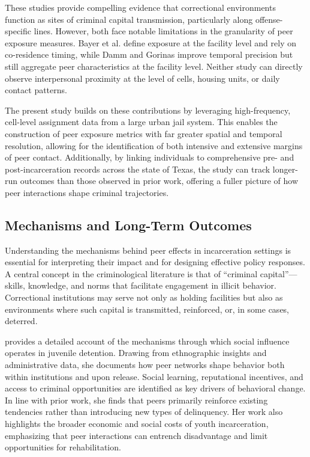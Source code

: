 \documentclass[12pt, a4paper]{article}
\begin{document}
These studies provide compelling evidence that correctional environments function as sites of criminal capital transmission, particularly along offense-specific lines. However, both face notable limitations in the granularity of peer exposure measures. Bayer et al. define exposure at the facility level and rely on co-residence timing, while Damm and Gorinas improve temporal precision but still aggregate peer characteristics at the facility level. Neither study can directly observe interpersonal proximity at the level of cells, housing units, or daily contact patterns.

The present study builds on these contributions by leveraging high-frequency, cell-level assignment data from a large urban jail system. This enables the construction of peer exposure metrics with far greater spatial and temporal resolution, allowing for the identification of both intensive and extensive margins of peer contact. Additionally, by linking individuals to comprehensive pre- and post-incarceration records across the state of Texas, the study can track longer-run outcomes than those observed in prior work, offering a fuller picture of how peer interactions shape criminal trajectories.

\subsection{Mechanisms and Long-Term Outcomes}

Understanding the mechanisms behind peer effects in incarceration settings is essential for interpreting their impact and for designing effective policy responses. A central concept in the criminological literature is that of ``criminal capital''—skills, knowledge, and norms that facilitate engagement in illicit behavior. Correctional institutions may serve not only as holding facilities but also as environments where such capital is transmitted, reinforced, or, in some cases, deterred.

\citet{stevenson2017breaking} provides a detailed account of the mechanisms through which social influence operates in juvenile detention. Drawing from ethnographic insights and administrative data, she documents how peer networks shape behavior both within institutions and upon release. Social learning, reputational incentives, and access to criminal opportunities are identified as key drivers of behavioral change. In line with prior work, she finds that peers primarily reinforce existing tendencies rather than introducing new types of delinquency. Her work also highlights the broader economic and social costs of youth incarceration, emphasizing that peer interactions can entrench disadvantage and limit opportunities for rehabilitation.
\end{document}
